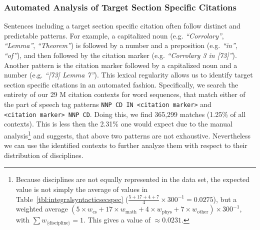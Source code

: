 \subsubsection{Automated Analysis of Target Section Specific Citations}\label{sec:specrevautoeval}
Sentences including a target section specific citation often follow distinct and predictable patterns. For example, a capitalized noun (e.g. \emph{``Corrolary''}, \emph{``Lemma''}, \emph{``Theorem''}) is followed by a number and a preposition (e.g. \emph{``in''},  \emph{``of''}), and then followed by the citation marker (e.g. \emph{``Corrolary 3 in [73]''}). Another pattern is the citation marker followed by a capitalized noun and a number (e.g. \emph{``[73] Lemma 7''}). This lexical regularity allows us to identify target section specific citations in an automated fashion. Specifically, we search the entirety of our 29 M citation contexts for word sequences, that match either of the part of speech tag patterns \texttt{NNP~CD~IN~<citation~marker>} and \texttt{<citation~marker>~NNP~CD}. Doing this, we find 365,299 matches (1.25\% of all contexts). This is less then the 2.31\% one would expect due to the manual analysis\footnote{Because disciplines are not equally represented in the data set, the expected value is not simply the average of values in Table~\ref{tbl:integralsyntacticsecspec} ($\frac{5+17+4+7}{4}\times 300^{-1}=0.0275$), but a weighted average $(5\times w_\text{cs}+17\times w_\text{math}+4\times w_\text{phys}+7\times w_\text{other})\times 300^{-1}$, with $\sum w_{\langle\text{discipline}\rangle}=1$. This gives a value of $\approx 0.0231$.} and suggests, that above two patterns are not exhaustive. Nevertheless we can use the identified contexts to further analyze them with respect to their distribution of disciplines.

%
%
%
%

